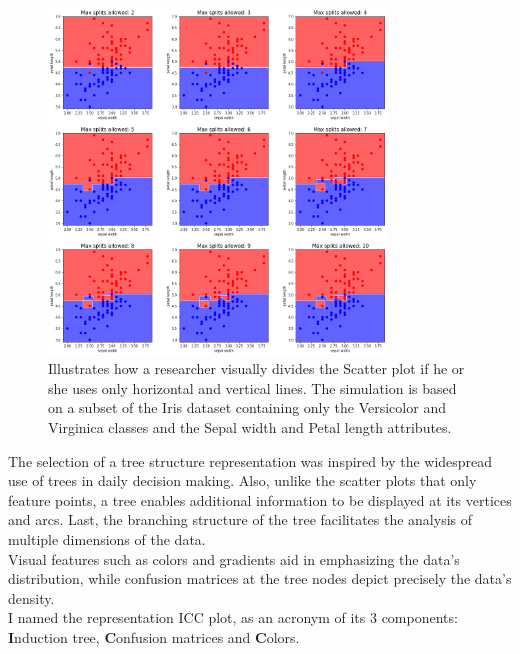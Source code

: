 \documentclass[12pt]{article}
\begin{document}
\begin{figure}[ht]
\centering
\includegraphics[width=0.8\textwidth]{scatter_plot_illustration.png}

\caption{Illustrates how a researcher visually divides the Scatter plot if he or she uses only horizontal and vertical lines. The simulation is based on a subset of the Iris dataset containing only the Versicolor and Virginica classes and the Sepal width and Petal length attributes.}
\label{fig:fig1}

\end{figure}

The selection of a tree structure representation was inspired by the widespread use of trees in daily decision making. Also, unlike the scatter plots that only feature points, a tree enables additional information to be displayed at its vertices and arcs. Last, the branching structure of the tree facilitates the analysis of multiple dimensions of the data. \\
Visual features such as colors and gradients aid in emphasizing the data's distribution, while confusion matrices at the tree nodes depict precisely the data's density. \\
I named the representation ICC plot, as an acronym of its 3 components: \textbf{I}nduction tree, \textbf{C}onfusion matrices and \textbf{C}olors.
\end{document}
